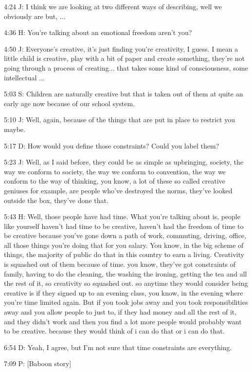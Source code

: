 4:24 J: I think we are looking at two different ways of describing, well we obviously are but, ...

4:36 H: You're talking about an emotional freedom aren't you?

4:50 J: Everyone's creative, it's just finding you're creativity, I guess. I mean a little child is creative, play with a bit of paper and create something, they're not going through a process of creating... that takes some kind of consciousness, some intellectual ...

5:03 S: Children are naturally creative but that is taken out of them at quite an early age now because of our school system.

5:10 J: Well, again, because of the things that are put in place to restrict you maybe.

5:17 D: How would you define those constraints? Could you label them?

5:23 J: Well, as I said before, they could be as simple as upbringing, society, the way we conform to society, the way we conform to convention, the way we conform to the way of thinking, you know, a lot of these so called creative geniuses for example, are people who've destroyed the norms, they've looked outside the box, they've done that.

5:43 H: Well, those people have had time. What you're talking about is, people like yourself haven't had time to be creative, haven't had the freedom of time to be creative because you've gone down a path of work, commuting, driving, office, all those things you're doing that for you salary. You know, in the big scheme of things, the majority of public do that in this country to earn a living. Creativity is squashed out of them because of time. you know, they've got constraints of family, having to do the cleaning, the washing the ironing, getting the tea and all the rest of it, so creativity so squashed out. so anytime they would consider being creative is if they signed up to an evening class, you know, in the evening where you're time limited again. But if you took jobs away and you took responsibilities away and you allow people to just to, if they had money and all the rest of it, and they didn't work and then you find a lot more people would probably want to be creative. because they would think of i can do that or i can do that.

6:54 D: Yeah, I agree, but I'm not sure that time constraints are everything.

7:09 P: [Baboon story]

